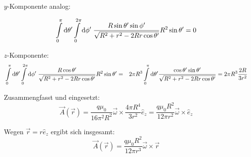 \documentclass[a4paper,german,12pt,smallheadings]{scrartcl}
\begin{document}
\begin{enumerate}[a)]
  $y$-Komponente analog:

  \begin{align}
    \int\limits_0^\pi \dif \theta'
    \int\limits_0^{2 \pi} \dif \phi' \;
    \frac{R \sin \theta' \sin \phi'}{\sqrt{R^2 + r^2 - 2Rr \cos \theta'}} R^2 \sin \theta' = 0
  \end{align}

  $z$-Komponente:
  \begin{align}
    &\int\limits_0^\pi \dif \theta'
    \int\limits_0^{2 \pi} \dif \phi' \;
    \frac{R \cos \theta'}{\sqrt{R^2 + r^2 - 2Rr \cos \theta'}} R^2 \sin \theta'
    =
    &2 \pi R^3
    \int\limits_0^\pi \dif \theta'
    \frac{\cos \theta' \sin \theta'}{\sqrt{R^2 + r^2 - 2Rr \cos \theta'}}
    = 2 \pi R^3 \frac{2R}{3 r^2}
  \end{align}

  Zusammengfasst und eingesetzt:
  \begin{equation}
    \vec{A}(\vec{r})
    = \frac{q \mu_0}{16 \pi^2 R^2} \vec{\omega} \times \frac{4 \pi R^4}{3 r^2} \hat{e}_z
    = \frac{q \mu_0 R^2}{12 \pi r^2} \vec{\omega} \times \hat{e}_z
  \end{equation}

  Wegen $\vec{r} = r \hat{e}_z$ ergibt sich insgesamt:
  \begin{equation}
    \vec{A}(\vec{r}) = \frac{q \mu_0 R^2}{12 \pi r^3} \vec{\omega} \times \vec{r}
  \end{equation}


\end{enumerate}
\end{document}
